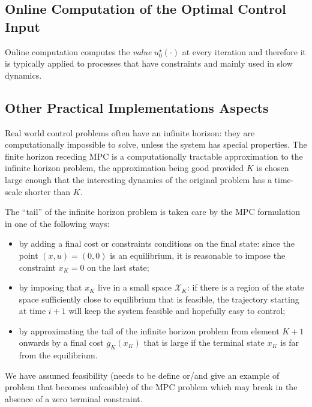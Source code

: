 \subsection{Online Computation of the Optimal Control Input}
\label{sec:online-computation-MPC}

Online computation computes the \emph{value} $u_0^\star(\cdot)$ at every iteration and therefore it is typically applied to processes that have constraints and mainly used in slow dynamics.

\subsection{Other Practical Implementations Aspects}
\label{sec:other-practical-implementation-aspects}

Real world control problems often have an infinite horizon: they are computationally impossible to solve, unless the system has special properties. The finite horizon receding MPC is a computationally tractable approximation to the infinite horizon problem, the approximation being good provided $K$ is chosen large enough that the interesting dynamics of the original problem has a time-scale shorter than $K$.

The ``tail'' of the infinite horizon problem is taken care by the MPC formulation in one of the following ways:
\begin{itemize}
\item by adding a final cost or constraints conditions on the final state: since the point $(x,u)=(0,0)$ is an equilibrium, it is reasonable to impose the constraint $x_K=0$ on the last state;
\item by imposing that $x_K$ live in a small space $\mathcal{X}_K$: if there is a region of the state space sufficiently close to equilibrium that is feasible, the trajectory starting at time $i+1$ will keep the system feasible and hopefully easy to control;
\item by approximating the tail of the infinite horizon problem from element $K+1$ onwards by a final cost $g_K(x_K)$ that is large if the terminal state $x_K$ is far from the equilibrium.
\end{itemize}

We have assumed feasibility (needs to be define or/and give an example of problem that becomes unfeasible) of the MPC problem which may break in the absence of a zero terminal constraint.

